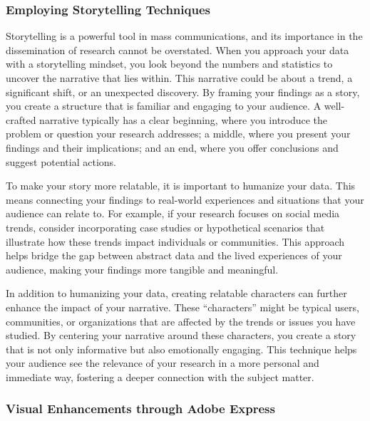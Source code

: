 \documentclass[
]{book}
\begin{document}
\subsubsection*{Employing Storytelling Techniques}\label{employing-storytelling-techniques}

Storytelling is a powerful tool in mass communications, and its importance in the dissemination of research cannot be overstated. When you approach your data with a storytelling mindset, you look beyond the numbers and statistics to uncover the narrative that lies within. This narrative could be about a trend, a significant shift, or an unexpected discovery. By framing your findings as a story, you create a structure that is familiar and engaging to your audience. A well-crafted narrative typically has a clear beginning, where you introduce the problem or question your research addresses; a middle, where you present your findings and their implications; and an end, where you offer conclusions and suggest potential actions.

To make your story more relatable, it is important to humanize your data. This means connecting your findings to real-world experiences and situations that your audience can relate to. For example, if your research focuses on social media trends, consider incorporating case studies or hypothetical scenarios that illustrate how these trends impact individuals or communities. This approach helps bridge the gap between abstract data and the lived experiences of your audience, making your findings more tangible and meaningful.

In addition to humanizing your data, creating relatable characters can further enhance the impact of your narrative. These ``characters'' might be typical users, communities, or organizations that are affected by the trends or issues you have studied. By centering your narrative around these characters, you create a story that is not only informative but also emotionally engaging. This technique helps your audience see the relevance of your research in a more personal and immediate way, fostering a deeper connection with the subject matter.

\subsubsection*{Visual Enhancements through Adobe Express}\label{visual-enhancements-through-adobe-express}
\end{document}
